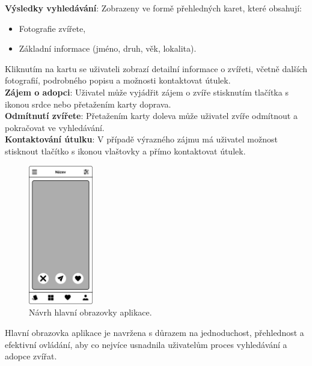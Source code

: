 \documentclass[12pt,a4paper]{report}
\begin{document}
\noindent \textbf{Výsledky vyhledávání}: Zobrazeny ve formě přehledných karet, které obsahují:

\begin{itemize}
    \item Fotografie zvířete,
    \item Základní informace (jméno, druh, věk, lokalita).
\end{itemize}

Kliknutím na kartu se uživateli zobrazí detailní informace o zvířeti, včetně dalších fotografií, podrobného popisu a možnosti kontaktovat útulek.\\

\noindent \textbf{Zájem o adopci}: Uživatel může vyjádřit zájem o zvíře stisknutím tlačítka s ikonou srdce nebo přetažením karty doprava.\\

\noindent \textbf{Odmítnutí zvířete}: Přetažením karty doleva může uživatel zvíře odmítnout a pokračovat ve vyhledávání.\\

\noindent \textbf{Kontaktování útulku}: V případě výrazného zájmu má uživatel možnost stisknout tlačítko s ikonou vlaštovky a přímo kontaktovat útulek.\\

\begin{figure}[h!]
    \centering
    \includegraphics[width=0.25\textwidth]{img/Main.png}
    \caption{Návrh hlavní obrazovky aplikace.}
    \label{fig:home_screen}
\end{figure}

Hlavní obrazovka aplikace je navržena s důrazem na jednoduchost, přehlednost a efektivní ovládání, aby co nejvíce usnadnila uživatelům proces vyhledávání a adopce zvířat.

\newpage
\end{document}
